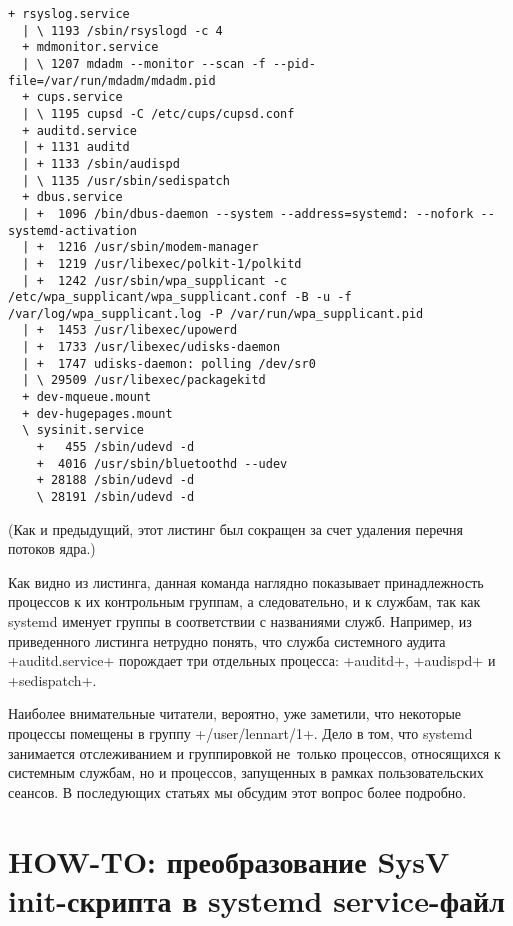 \documentclass[10pt,oneside,a4paper]{article}
\begin{document}
\begin{landscape}
\begin{Verbatim}[fontsize=\small]
  + rsyslog.service
  | \ 1193 /sbin/rsyslogd -c 4
  + mdmonitor.service
  | \ 1207 mdadm --monitor --scan -f --pid-file=/var/run/mdadm/mdadm.pid
  + cups.service
  | \ 1195 cupsd -C /etc/cups/cupsd.conf
  + auditd.service
  | + 1131 auditd
  | + 1133 /sbin/audispd
  | \ 1135 /usr/sbin/sedispatch
  + dbus.service
  | +  1096 /bin/dbus-daemon --system --address=systemd: --nofork --systemd-activation
  | +  1216 /usr/sbin/modem-manager
  | +  1219 /usr/libexec/polkit-1/polkitd
  | +  1242 /usr/sbin/wpa_supplicant -c /etc/wpa_supplicant/wpa_supplicant.conf -B -u -f /var/log/wpa_supplicant.log -P /var/run/wpa_supplicant.pid
  | +  1453 /usr/libexec/upowerd
  | +  1733 /usr/libexec/udisks-daemon
  | +  1747 udisks-daemon: polling /dev/sr0
  | \ 29509 /usr/libexec/packagekitd
  + dev-mqueue.mount
  + dev-hugepages.mount
  \ sysinit.service
    +   455 /sbin/udevd -d
    +  4016 /usr/sbin/bluetoothd --udev
    + 28188 /sbin/udevd -d
    \ 28191 /sbin/udevd -d
\end{Verbatim}
(Как и предыдущий, этот листинг был сокращен за счет удаления перечня потоков
ядра.)
\end{landscape}

Как видно из листинга, данная команда наглядно показывает принадлежность
процессов к их контрольным группам, а следовательно, и к службам, так как
systemd именует группы в соответствии с названиями служб. Например, из
приведенного листинга нетрудно понять, что служба системного аудита
+auditd.service+ порождает три отдельных процесса: +auditd+,
+audispd+ и +sedispatch+.

Наиболее внимательные читатели, вероятно, уже заметили, что некоторые процессы
помещены в группу +/user/lennart/1+. Дело в том, что systemd занимается
отслеживанием и группировкой не~только процессов, относящихся к системным
службам, но и процессов, запущенных в рамках пользовательских сеансов. В
последующих статьях мы обсудим этот вопрос более подробно. 

\section{HOW-TO: преобразование SysV init-скрипта в systemd service-файл}
\end{document}
